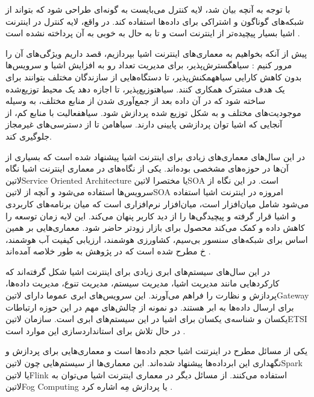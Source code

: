 با توجه به آنچه بیان شد، لایه کنترل می‌بایست به گونه‌ای طراحی شود که بتواند از شبکه‌های گوناگون و اشتراکی برای داده‌ها استفاده کند.
در واقع، لایه کنترل در اینترنت اشیا بسیار پیچیده‌تر از اینترنت است و تا به حال به خوبی به آن پرداخته نشده است
.


پیش از آنکه بخواهیم به معماری‌های اینترنت اشیا بپردازیم، قصد داریم ویژگی‌های آن را مرور کنیم
:
 ‌سیاه{گسترش‌پذیر}، برای مدیریت تعداد رو به افزایش اشیا و سرویس‌ها بدون کاهش کارایی
 ‌سیاه{همکنش‌پذیر}، تا دستگاه‌هایی از سازندگان مختلف بتوانند برای یک هدف مشترک همکاری کنند.
 ‌سیاه{توزیع‌پذیر}، تا اجازه دهد یک محیط توزیع‌شده ساخته شود که در آن داده بعد از جمع‌آوری شدن از منابع مختلف، به وسیله موجودیت‌های مختلف و به شکل توزیع شده پردازش شود.
 ‌سیاه{فعالیت با منابع کم}، از آنجایی که اشیا توان پردازشی پایینی دارند.
 ‌سیاه{امن} تا از دسترسی‌های غیرمجاز جلوگیری کند.

در این سال‌های معماری‌های زیادی برای اینترنت اشیا پیشنهاد شده است که بسیاری از آن‌ها در حوزه‌های مشخصی بوده‌اند.
یکی از نگاه‌های در معماری اینترنت اشیا نگاه ‌لاتین{Service Oriented Architecture} یا مختصرا ‌لاتین{SOA} است.
در این نگاه از سرویس‌ها استفاده می‌شود و آنچه از ‌لاتین{SOA} امروزه در اینترنت اشیا استفاده می‌شود شامل میان‌افزار است، میان‌افزار نرم‌افزاری است که
میان برنامه‌های کاربردی و اشیا قرار گرفته و پیچیدگی‌ها را از دید کاربر پنهان می‌کند. این لایه زمان توسعه را کاهش داده و کمک می‌کند محصول برای بازار
زودتر حاضر شود. معماری‌هایی بر همین اساس برای شبکه‌های سنسور بی‌سیم، کشاورزی هوشمند، ارزیابی کیفیت آب هوشمند، ‌خ مطرح شده است که در پژوهش  به طور خلاصه آمده‌اند
.

در این سال‌های سیستم‌های ابری زیادی برای اینترنت اشیا شکل گرفته‌اند که کارکردهایی مانند مدیریت اشیا، مدیریت سیستم، مدیریت تنوع، مدیریت داده‌ها، پردازش و
نظارت را فراهم می‌آورند. این سرویس‌های ابری عموما دارای ‌لاتین{Gateway} برای ارسال داده‌ها به ابر هستند. دو نمونه از چالش‌های مهم در این حوزه ارتباطات یکسان و
شناسه‌ی یکسان برای اشیا در این سیستم‌های ابری است. سازمان ‌لاتین{ETSI} در حال تلاش برای استانداردسازی این موارد است
.

یکی از مسائل مطرح در اینرتنت اشیا حجم داده‌ها است و معماری‌هایی برای پردازش و نگهداری این ابرداده‌ها پیشنهاد شده‌اند. این معماری‌ها از سیستم‌هایی چون ‌لاتین{Spark} یا ‌لاتین{Flink} استفاده می‌کنند.
از مسائل دیگر در معماری اینترنت اشیا می‌توان به ‌لاتین{Fog Computing} یا پردازش مِه اشاره کرد
.

